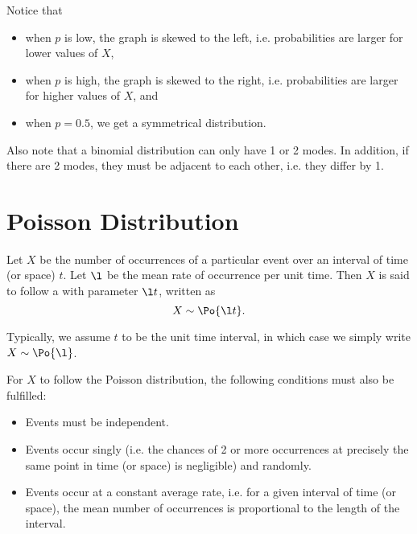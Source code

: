 Notice that
\begin{itemize}
    \item when $p$ is low, the graph is skewed to the left, i.e. probabilities are larger for lower values of $X$,
    \item when $p$ is high, the graph is skewed to the right, i.e. probabilities are larger for higher values of $X$, and
    \item when $p = 0.5$, we get a symmetrical distribution.
\end{itemize}

Also note that a binomial distribution can only have 1 or 2 modes. In addition, if there are 2 modes, they must be adjacent to each other, i.e. they differ by 1.

\section{Poisson Distribution}

\begin{definition}
    Let $X$ be the number of occurrences of a particular event over an interval of time (or space) $t$. Let $\l$ be the mean rate of occurrence per unit time. Then $X$ is said to follow a  with parameter $\l t$, written as \[X \sim \Po{\l t}.\]
\end{definition}
\begin{remark}
    Typically, we assume $t$ to be the unit time interval, in which case we simply write $X \sim \Po{\l}$.
\end{remark}

For $X$ to follow the Poisson distribution, the following conditions must also be fulfilled:

\begin{condition}\label{con:Poisson}
    \phantom{.}
    \begin{itemize}
        \item Events must be independent.
        \item Events occur singly (i.e. the chances of 2 or more occurrences at precisely the same point in time (or space) is negligible) and randomly.
        \item Events occur at a constant average rate, i.e. for a given interval of time (or space), the mean number of occurrences is proportional to the length of the interval.
    \end{itemize}
\end{condition}

